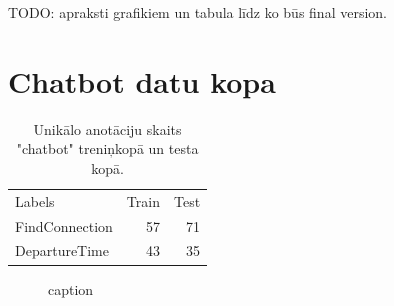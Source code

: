 TODO: apraksti grafikiem un tabula līdz ko būs final version.

\section{Chatbot datu kopa}

\begin{table}[htbp]
  \centering
  \caption{Unikālo anotāciju skaits "chatbot" treniņkopā un testa kopā.}
    \begin{tabular}{lrr}
    Labels & Train & Test \\
    FindConnection & 57    & 71 \\
    DepartureTime & 43    & 35 \\
    \end{tabular}%
  \label{tab:chatbot-labels}%
\end{table}%

\begin{figure}[h] 
   \centering
   \caption{caption} 
   \label{fig:chatbot-bert}
\end{figure}



